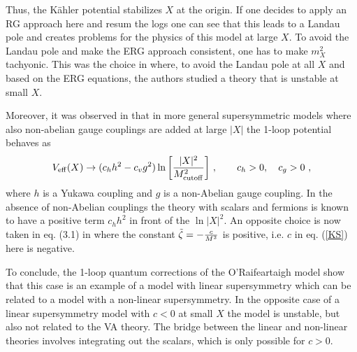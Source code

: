 \documentclass[11pt]{article}
\newcommand{\be}{\begin{equation}}
\newcommand{\ee}{\end{equation}}
\def\K{K{\"a}hler }
\newcommand{\rf}[1]{(\ref{#1})}
\def\be{\begin{equation}}
\def\ee{\end{equation}}
\newcommand{\ls}{\left[}
\newcommand{\rs}{\right]}
\begin{document}
Thus, the \K potential stabilizes $X$ at the origin. If one decides to apply an RG approach here and resum the logs one can see that this leads to a Landau pole and creates problems for the physics of this model at large $X$. To avoid the Landau pole and make the ERG approach consistent, one has to make $m_X^2$ tachyonic. This was the choice in \cite{DallAgata:2022abm} where, to avoid the Landau pole at all $X$ and based on the ERG equations, the authors studied a theory that is unstable at small $X$.


Moreover, it was  observed in \cite{Witten:1981kv, Intriligator:2007py} that in more general supersymmetric models where also non-abelian gauge couplings are added at large $|X|$ the 1-loop potential behaves as 
\be
V_{\rm eff}(X) \to  (c_h h^2- c_v g^2) \ln \ls {|X|^2\over M^2_{\rm cutoff}} \rs\, , \qquad c_h>0,\quad c_g >0 \ ,
\ee
where $h$ is a Yukawa coupling and $g$ is a non-Abelian gauge coupling. In the absence of non-Abelian couplings the theory with scalars and fermions is known to have a positive term $c_h h^2$ in front of the $\ln |X|^2$. An opposite choice is now taken in eq. (3.1) in \cite{DallAgata:2022abm} where the constant $\tilde \zeta = -{c\over M^2}$ is positive, i.e. $c$ in eq. \rf{KS} here is negative. 

To conclude, the 1-loop quantum corrections of the O'Raifeartaigh model show that this case is an example of a model with linear supersymmetry which can be related to a model with a non-linear supersymmetry. In the opposite case of a linear supersymmetry model with $c<0$ at small $X$ the model is unstable, but also not related to the VA theory. The bridge between the linear and non-linear theories involves integrating out the scalars, which is only possible for $c>0$.
\end{document}
